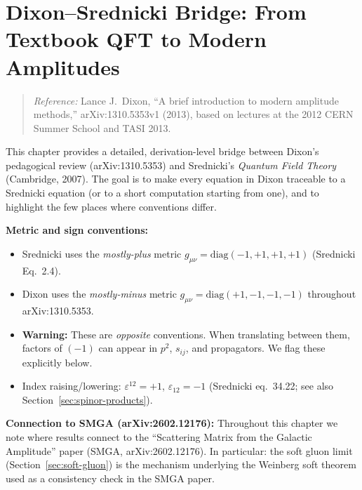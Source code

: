 
\chapter{Dixon--Srednicki Bridge: From Textbook QFT to Modern Amplitudes}
\label{chap:dixon-srednicki}

\begin{quote}
\textit{Reference:} Lance J.\ Dixon, ``A brief introduction to modern amplitude methods,''
arXiv:1310.5353v1 (2013), based on lectures at the 2012 CERN Summer School and TASI 2013.
\end{quote}

This chapter provides a detailed, derivation-level bridge between Dixon's pedagogical
review (arXiv:1310.5353) and Srednicki's \emph{Quantum Field Theory} (Cambridge, 2007).
The goal is to make every equation in Dixon traceable to a Srednicki equation (or to
a short computation starting from one), and to highlight the few places where conventions differ.

\medskip
\noindent\textbf{Metric and sign conventions:}
\begin{itemize}
  \item Srednicki uses the \emph{mostly-plus} metric $g_{\mu\nu}=\mathrm{diag}(-1,+1,+1,+1)$ (Srednicki Eq.~2.4).
  \item Dixon uses the \emph{mostly-minus} metric $g_{\mu\nu}=\mathrm{diag}(+1,-1,-1,-1)$ throughout arXiv:1310.5353.
  \item \textbf{Warning:} These are \emph{opposite} conventions. When translating between them, factors of $(-1)$ can appear in $p^2$, $s_{ij}$, and propagators. We flag these explicitly below.
  \item Index raising/lowering: $\varepsilon^{12}=+1$, $\varepsilon_{12}=-1$
        (Srednicki eq.~34.22; see also Section~\ref{sec:spinor-products}).
\end{itemize}

\noindent\textbf{Connection to SMGA (arXiv:2602.12176):}
Throughout this chapter we note where results connect to the
``Scattering Matrix from the Galactic Amplitude'' paper (SMGA, arXiv:2602.12176).
In particular: the soft gluon limit (Section~\ref{sec:soft-gluon}) is the
mechanism underlying the Weinberg soft theorem used as a consistency check in the SMGA paper.


